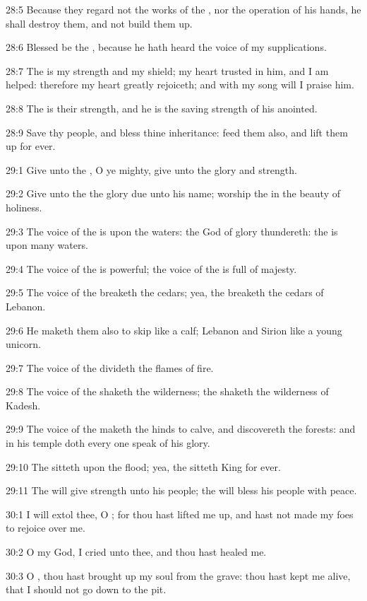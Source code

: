 28:5 Because they regard not the works of the \LORD, nor the operation
of his hands, he shall destroy them, and not build them up.

28:6 Blessed be the \LORD, because he hath heard the voice of my
supplications.

28:7 The \LORD is my strength and my shield; my heart trusted in him,
and I am helped: therefore my heart greatly rejoiceth; and with my
song will I praise him.

28:8 The \LORD is their strength, and he is the saving strength of his
anointed.

28:9 Save thy people, and bless thine inheritance: feed them also, and
lift them up for ever.



29:1 Give unto the \LORD, O ye mighty, give unto the \LORD glory and
strength.

29:2 Give unto the \LORD the glory due unto his name; worship the \LORD
in the beauty of holiness.

29:3 The voice of the \LORD is upon the waters: the God of glory
thundereth: the \LORD is upon many waters.

29:4 The voice of the \LORD is powerful; the voice of the \LORD is full
of majesty.

29:5 The voice of the \LORD breaketh the cedars; yea, the \LORD breaketh
the cedars of Lebanon.

29:6 He maketh them also to skip like a calf; Lebanon and Sirion like
a young unicorn.

29:7 The voice of the \LORD divideth the flames of fire.

29:8 The voice of the \LORD shaketh the wilderness; the \LORD shaketh
the wilderness of Kadesh.

29:9 The voice of the \LORD maketh the hinds to calve, and discovereth
the forests: and in his temple doth every one speak of his glory.

29:10 The \LORD sitteth upon the flood; yea, the \LORD sitteth King for
ever.

29:11 The \LORD will give strength unto his people; the \LORD will bless
his people with peace.



30:1 I will extol thee, O \LORD; for thou hast lifted me up, and hast
not made my foes to rejoice over me.

30:2 O \LORD my God, I cried unto thee, and thou hast healed me.

30:3 O \LORD, thou hast brought up my soul from the grave: thou hast
kept me alive, that I should not go down to the pit.

